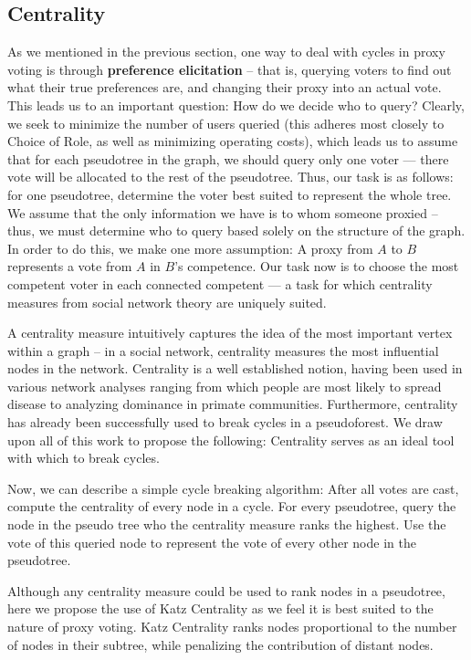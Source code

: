 \documentclass[10pt]{article}
\theoremstyle{definition}
\begin{document}
\subsection{Centrality}

As we mentioned in the previous section, one way to deal with cycles in proxy voting is through \textbf{preference elicitation} -- that is, querying voters to find out what their true preferences are, and changing their proxy into an actual vote. This leads us to an important question: How do we decide who to query? Clearly, we seek to minimize the number of users queried (this adheres most closely to Choice of Role, as well as minimizing operating costs), which leads us to assume that for each pseudotree in the graph, we should query only one voter --- there vote will be allocated to the rest of the pseudotree. Thus, our task is as follows: for one pseudotree, determine the voter best suited to represent the whole tree. We assume that the only information we have is to whom someone proxied -- thus, we must determine who to query based solely on the structure of the graph. In order to do this, we make one more assumption: A proxy from $A$ to $B$ represents a vote from $A$ in $B$'s competence. Our task now is to choose the most competent voter in each connected competent --- a task for which centrality measures from social network theory are uniquely suited.

A centrality measure intuitively captures the idea of the most important vertex within a graph -- in a social network, centrality measures the most influential nodes in the network.\cite{centrality}\cite{cwiki} Centrality is a well established notion, having been used in various network analyses ranging from which people are most likely to spread disease to analyzing dominance in primate communities. Furthermore, centrality has already been successfully used to break cycles in a pseudoforest.\cite{wikipedia} We draw upon all of this work to propose the following: Centrality serves as an ideal tool with which to break cycles. 

Now, we can describe a simple cycle breaking algorithm: After all votes are cast, compute the centrality of every node in a cycle. For every pseudotree, query the node in the pseudo tree who the centrality measure ranks the highest. Use the vote of this queried node to represent the vote of every other node in the pseudotree.

Although any centrality measure could be used to rank nodes in a pseudotree, here we propose the use of Katz Centrality as we feel it is best suited to the nature of proxy voting. Katz Centrality ranks nodes proportional to the number of nodes in their subtree, while penalizing the contribution of distant nodes.
\end{document}
